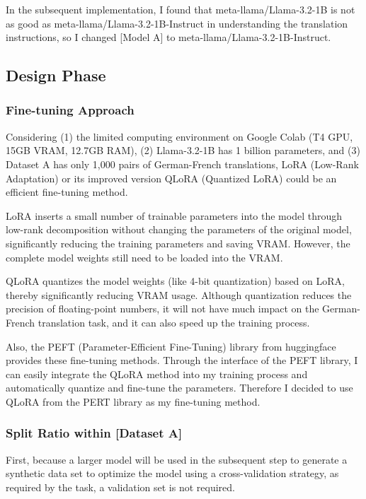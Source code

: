 In the subsequent implementation, 
I found that meta-llama/Llama-3.2-1B is not as good as meta-llama/Llama-3.2-1B-Instruct 
in understanding the translation instructions, 
so I changed [Model A] to meta-llama/Llama-3.2-1B-Instruct.

\subsection{Design Phase}
\label{subsec:design}

\subsubsection{Fine-tuning Approach}
Considering
(1) the limited computing environment on Google Colab (T4 GPU, 15GB VRAM, 12.7GB RAM), 
(2) Llama-3.2-1B has 1 billion parameters, and 
(3) Dataset A has only 1,000 pairs of German-French translations,
LoRA (Low-Rank Adaptation) \cite{hu2021lora} or its improved version 
QLoRA (Quantized LoRA) \cite{dettmers2023qlora} could be an efficient fine-tuning method.

LoRA inserts a small number of trainable parameters into the model 
through low-rank decomposition without changing the parameters of the original model, 
significantly reducing the training parameters and saving VRAM. 
However, the complete model weights still need to be loaded into the VRAM.

QLoRA quantizes the model weights (like 4-bit quantization) based on LoRA, 
thereby significantly reducing VRAM usage.
Although quantization reduces the precision of floating-point numbers, 
it will not have much impact on the German-French translation task, 
and it can also speed up the training process.

Also, the PEFT (Parameter-Efficient Fine-Tuning) library \cite{peft} from huggingface provides these fine-tuning methods.
Through the interface of the PEFT library, 
I can easily integrate the QLoRA method into my training process and automatically quantize and fine-tune the parameters.
Therefore I decided to use QLoRA from the PERT library as my fine-tuning method.

\subsubsection{Split Ratio within [Dataset A]}
First, because a larger model will be used in the subsequent step to 
generate a synthetic data set to optimize the model using a cross-validation strategy, 
as required by the task, a validation set is not required.

